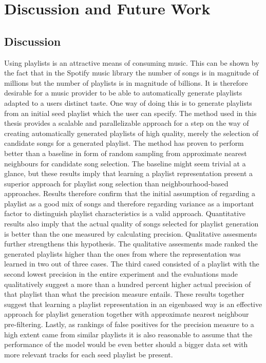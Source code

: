 \documentclass[a4paper,11pt]{kth-mag}
\begin{document}
\chapter{Discussion and Future Work}

\section{Discussion}
Using playlists is an attractive means of consuming music. This can be shown by the fact that in the Spotify music library the number of songs is in magnitude of millions but the number of playlists is in magnitude of billions. It is therefore desirable for a music provider to be able to automatically generate playlists adapted to a users distinct taste. One way of doing this is to generate playlists from an initial seed playlist which the user can specify.
 The method used in this thesis provides a scalable and parallelizable approach for a step on the way of creating automatically generated playlists of high quality, merely the selection of candidate songs for a generated playlist. The method has proven to perform better than a baseline in form of random sampling from approximate nearest neighbours for candidate song selection. The baseline might seem trivial at a glance, but these results imply that learning a playlist representation present a superior approach for playlist song selection than neighbourhood-based approaches. Results therefore confirm that the initial assumption of regarding a playlist as a good mix of songs and therefore regarding variance as a important factor to distinguish playlist characteristics is a valid approach.
 Quantitative results also imply that the actual quality of songs selected for playlist generation is better than the one measured by calculating precision. Qualitative assesments further strengthens this hypothesis. The qualitative assesments made ranked the generated playlists higher than the ones from where the representation was learned in two out of three cases. The third cased consisted of a playlist with the second lowest precision in the entire experiment and the evaluations made qualitatively suggest a more than a hundred percent higher actual precision of that playlist than what the precision measure entails. These results together suggest that learning a playlist representation in an eigenbased way is an effective approach for playlist generation together with approximate nearest neighbour pre-filtering. Lastly, as rankings of false positives for the precision measure to a high extent came from similar playlists it is also reasonable to assume that the performance of the model would be even better should a bigger data set with more relevant tracks for each seed playlist be present. 
\end{document}
